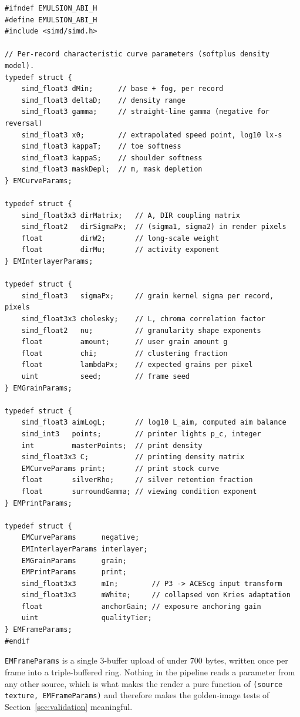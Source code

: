 \begin{lstlisting}[language=Metal, caption={Shared parameter block (\texttt{EmulsionABI.h}).}, label={lst:abi}]
#ifndef EMULSION_ABI_H
#define EMULSION_ABI_H
#include <simd/simd.h>

// Per-record characteristic curve parameters (softplus density model).
typedef struct {
    simd_float3 dMin;      // base + fog, per record
    simd_float3 deltaD;    // density range
    simd_float3 gamma;     // straight-line gamma (negative for reversal)
    simd_float3 x0;        // extrapolated speed point, log10 lx-s
    simd_float3 kappaT;    // toe softness
    simd_float3 kappaS;    // shoulder softness
    simd_float3 maskDepl;  // m, mask depletion
} EMCurveParams;

typedef struct {
    simd_float3x3 dirMatrix;   // A, DIR coupling matrix
    simd_float2   dirSigmaPx;  // (sigma1, sigma2) in render pixels
    float         dirW2;       // long-scale weight
    float         dirMu;       // activity exponent
} EMInterlayerParams;

typedef struct {
    simd_float3   sigmaPx;     // grain kernel sigma per record, pixels
    simd_float3x3 cholesky;    // L, chroma correlation factor
    simd_float2   nu;          // granularity shape exponents
    float         amount;      // user grain amount g
    float         chi;         // clustering fraction
    float         lambdaPx;    // expected grains per pixel
    uint          seed;        // frame seed
} EMGrainParams;

typedef struct {
    simd_float3 aimLogL;       // log10 L_aim, computed aim balance
    simd_int3   points;        // printer lights p_c, integer
    int         masterPoints;  // print density
    simd_float3x3 C;           // printing density matrix
    EMCurveParams print;       // print stock curve
    float       silverRho;     // silver retention fraction
    float       surroundGamma; // viewing condition exponent
} EMPrintParams;

typedef struct {
    EMCurveParams      negative;
    EMInterlayerParams interlayer;
    EMGrainParams      grain;
    EMPrintParams      print;
    simd_float3x3      mIn;        // P3 -> ACEScg input transform
    simd_float3x3      mWhite;     // collapsed von Kries adaptation
    float              anchorGain; // exposure anchoring gain
    uint               qualityTier;
} EMFrameParams;
#endif
\end{lstlisting}

\texttt{EMFrameParams} is a single 3-buffer upload of under 700 bytes, written
once per frame into a triple-buffered ring. Nothing in the pipeline reads a
parameter from any other source, which is what makes the render a pure function
of \texttt{(source texture, EMFrameParams)} and therefore makes the golden-image
tests of Section~\ref{sec:validation} meaningful.

